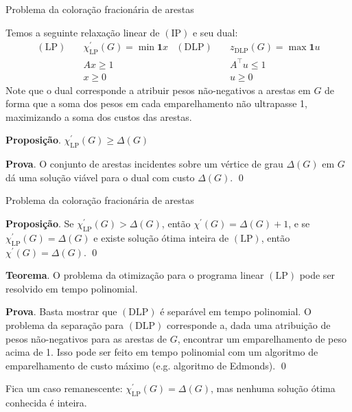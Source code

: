 \documentclass{beamer}
\begin{document}
    \begin{frame}{Problema da coloração fracionária de arestas}

        Temos a seguinte relaxação linear de {\color{blue} $(\mathrm{IP})$} e seu dual:
        {\color{blue}
            \begin{align*}
                (\mathrm{LP})\quad&\chi^\prime_\mathrm{LP}(G) = \min \mathbf{1} x
                &(\mathrm{DLP})\quad&z_\mathrm{DLP}(G) = \max \mathbf{1} u\\
                &A x \geq 1&&A^\top u \leq 1\\
                &x \geq 0&&u \geq 0                
            \end{align*}
        }
        Note que o dual corresponde a atribuir pesos não-negativos a arestas em {\color{blue} $G$} de forma que a soma dos pesos em cada emparelhamento não ultrapasse 1, maximizando a soma dos custos das arestas.

        \pause
        \vspace{.5cm}
        {\color{blue} {\bf Proposição}}. {\color{blue} $\chi^\prime_\mathrm{LP}(G) \geq \Delta(G)$}

        \vspace{.5cm}
        {\color{blue} {\bf Prova}}. O conjunto de arestas incidentes sobre um vértice de grau {\color{blue} $\Delta(G)$} em {\color{blue} $G$} dá uma solução viável para o dual com custo {\color{blue} $\Delta(G)$}. \qed
    \end{frame}

    \begin{frame}{Problema da coloração fracionária de arestas}

        {\color{blue} {\bf Proposição}}. Se {\color{blue} $\chi^\prime_\mathrm{LP}(G) > \Delta(G)$}, então {\color{blue} $\chi^\prime(G) = \Delta(G) + 1$}, e se {\color{blue} $\chi^\prime_\mathrm{LP}(G) = \Delta(G)$} e existe solução ótima inteira de {\color{blue} $(\mathrm{LP})$}, então {\color{blue} $\chi^\prime(G) = \Delta(G)$}. \qed
        \pause

        \vspace{.5cm}
        {\color{blue} {\bf Teorema}}. O problema da otimização para o programa linear {\color{blue} $(\mathrm{LP})$} pode ser resolvido em tempo polinomial.

        \pause
        \vspace{.5cm}
        {\color{blue} {\bf Prova}}. Basta mostrar que {\color{blue} $(\mathrm{DLP})$} é separável em tempo polinomial.
        \pause
        O problema da separação para {\color{blue} $(\mathrm{DLP})$} corresponde a, dada uma atribuição de pesos não-negativos para as arestas de {\color{blue} $G$}, encontrar um emparelhamento de peso acima de 1.
        \pause
        Isso pode ser feito em tempo polinomial com um algoritmo de emparelhamento de custo máximo (e.g. algoritmo de Edmonds). \qed

        \pause
        \vspace{.5cm}
        Fica um caso remanescente: {\color{blue} $\chi^\prime_\mathrm{LP}(G) = \Delta(G)$}, mas nenhuma solução ótima conhecida é inteira.
    \end{frame}
\end{document}
